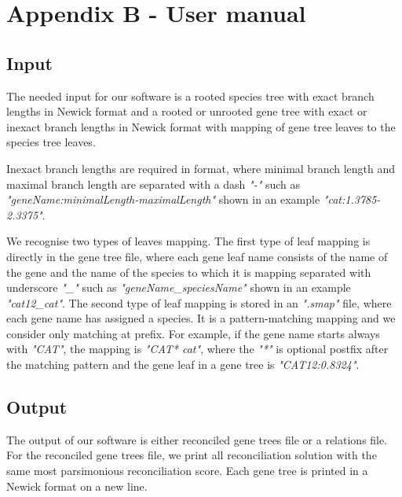 \documentclass[12pt,a4paper,oneside]{book}
\begin{document}
\sloppy

\part*{Appendix B - User manual}

\tableofcontents

\mainmatter

\chapter{Input} \label{Input}

The needed input for our software is a rooted species tree with exact branch lengths in Newick format and a rooted or unrooted gene tree with exact or inexact branch lengths in Newick format with mapping of gene tree leaves to the species tree leaves.

Inexact branch lengths are required in format, where minimal branch length and maximal branch length are separated with a dash \emph{"-"} such as \emph{"geneName:minimalLength-maximalLength"} shown in an example \emph{"cat:1.3785-2.3375"}.

We recognise two types of leaves mapping. The first type of leaf mapping is directly in the gene tree file, where each gene leaf name consists of the name of the gene and the name of the species to which it is mapping separated with underscore \emph{"\_"} such as \emph{"geneName\_speciesName"} shown in an example \emph{"cat12\_cat"}. The second type of leaf mapping is stored in an \emph{".smap"} file, where each gene name has assigned a species. It is a pattern-matching mapping and we consider only matching at prefix. For example, if the gene name starts always with \emph{"CAT"}, the mapping is \emph{"CAT*	cat"}, where the \emph{"*"} is optional postfix after the matching pattern and the gene leaf in a gene tree is \emph{"CAT12:0.8324"}.

\chapter{Output} \label{Output}

The output of our software is either reconciled gene trees file or a relations file. For the reconciled gene trees file, we print all reconciliation solution with the same most parsimonious reconciliation score. Each gene tree is printed in a Newick format on a new line.
\end{document}
